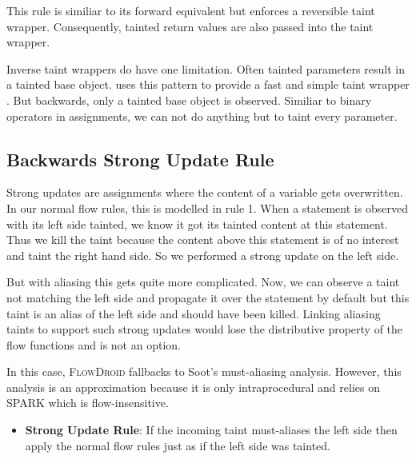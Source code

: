 \documentclass[../draft.tex]{subfiles}
\begin{document}
    This rule is similiar to its forward equivalent but enforces a reversible taint wrapper. Consequently, tainted return values are also passed into the taint wrapper.

    Inverse taint wrappers do have one limitation. Often tainted parameters result in a tainted base object.  uses this pattern to provide a fast and simple taint wrapper \cite{Arzt2017PhD}. But backwards, only a tainted base object is observed. Similiar to binary operators in assignments, we can not do anything but to taint every parameter.


    \subsection{Backwards Strong Update Rule}
    Strong updates are assignments where the content of a variable gets overwritten. In our normal flow rules, this is modelled in rule 1. When a statement is observed with its left side tainted, we know it got its tainted content at this statement. Thus we kill the taint because the content above this statement is of no interest and taint the right hand side. So we performed a strong update on the left side. 

    But with aliasing this gets quite more complicated. Now, we can observe a taint not matching the left side and propagate it over the statement by default but this taint is an alias of the left side and should have been killed. Linking aliasing taints to support such strong updates would lose the distributive property of the flow functions and is not an option. 
    
    In this case, \textsc{FlowDroid} fallbacks to Soot's must-aliasing analysis. However, this analysis is an approximation because it is only intraprocedural and relies on SPARK which is flow-insensitive.

    \begin{itemize}
        \item \textbf{Strong Update Rule}: If the incoming taint must-aliases the left side then apply the normal flow rules just as if the left side was tainted. 
    \end{itemize}
\end{document}

